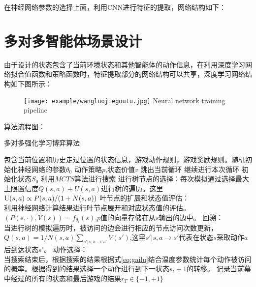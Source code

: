 在神经网络参数的选择上面，利用CNN进行特征的提取，网络结构如下：

\section{多对多智能体场景设计}
由于设计的状态包含了当前环境状态和其他智能体的动作信息，在利用深度学习网络拟合值函数和策略函数时，特征提取部分的网络结构可以共享，深度学习网络结构如下图所示：
\begin{figure}[!htp]
	\centering
	\texttt{[image: example/wangluojiegoutu.jpg]}
	{Neural network training pipeline}
	\label{fig:wangluojiegoutu}
\end{figure}
算法流程图：
\begin{algorithm}[!hbp]
	\caption{多对多强化学习博弈算法}%
	\begin{algorithmic}[1]%
		\Require
		包含当前位置和历史走过位置的状态信息，游戏动作规则，游戏奖励规则。随机初始化神经网络的参数$\theta_0$
		\Ensure 
		动作策略$p$,状态价值$v$
		\State 跳出当前循环
		\Else
		\State 继续进行本次循环
		\EndIf
		\State 初始化状态$S_0$
		\State 利用$MCTS$算法进行搜索
		\State 进行树节点的选择：每次模拟通过选择最大上限置信度$Q(s,a)+U(s,a)$进行树的遍历。这里${\rm{U}}(s,a) \propto P(s,a)/(1 + N(s,a))$
		\State 叶节点的扩展和状态值评估：
		\\
		利用神经网络计算结果进行叶节点展开和对应状态值的评估。$(P(s, \cdot ),V(s)) = {f_{{\theta _i}}}(s)$,$p$值的向量存储在从$s$输出的边中。
		\State 回溯：
		\\当进行树的模拟遍历时，被访问的边会进行相应的节点访问次数更新，$Q(s,a) = 1/N(s,a)\sum\nolimits_{s'|s,a \to s'} {V(s')} $,这里${s'|s,a \to s'}$代表在状态$s$采取动作$a$后到达状态$s'$。
		\EndWhile
		\State 动作选择：
		\\当搜索结束后，根据搜索的结果根据式\ref{eq:gailu}结合温度参数统计每个动作被访问的概率。根据得到的结果选择一个动作进行到下一状态$s_t+1$的转移。
		\EndFor
		\State 记录当前幕中经过的所有的状态和最后游戏的结果${r_T} \in \{  - 1, + 1\} $

\end{algorithmic}
\end{algorithm}
